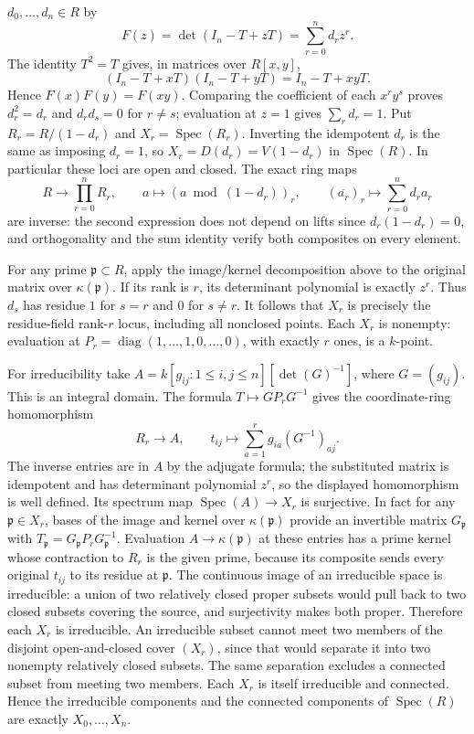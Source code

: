 \begin{example}
$d_0,\ldots,d_n\in R$ by
$$
F(z)=\det(I_n-T+zT)=\sum_{r=0}^n d_rz^r.
$$
The identity $T^2=T$ gives, in matrices over $R[x,y]$,
$$
(I_n-T+xT)(I_n-T+yT)=I_n-T+xyT.
$$
Hence $F(x)F(y)=F(xy)$. Comparing the coefficient of each
$x^ry^s$ proves $d_r^2=d_r$ and $d_rd_s=0$ for $r\ne s$;
evaluation at $z=1$ gives $\sum_r d_r=1$.
Put $R_r=R/(1-d_r)$ and $X_r=\operatorname{Spec}(R_r)$.
Inverting the idempotent $d_r$ is the same as imposing $d_r=1$,
so $X_r=D(d_r)=V(1-d_r)$ in $\operatorname{Spec}(R)$.
In particular these loci are open and closed. The exact ring maps
$$
R\longrightarrow\prod_{r=0}^n R_r,
\qquad a\longmapsto(a\bmod(1-d_r))_r,
\qquad
(\overline{a_r})_r\longmapsto\sum_{r=0}^n d_ra_r
$$
are inverse: the second expression does not depend on lifts since
$d_r(1-d_r)=0$, and orthogonality and the sum identity verify both
composites on every element.

For any prime $\mathfrak p\subset R$, apply the image/kernel
decomposition above to the original matrix over $\kappa(\mathfrak p)$.
If its rank is $r$, its determinant polynomial is exactly $z^r$.
Thus $d_s$ has residue $1$ for $s=r$ and $0$ for $s\ne r$.
It follows that $X_r$ is precisely the residue-field rank-$r$
locus, including all nonclosed points. Each $X_r$ is nonempty:
evaluation at $P_r=\operatorname{diag}(1,\ldots,1,0,\ldots,0)$,
with exactly $r$ ones, is a $k$-point.

For irreducibility take
$A=k[g_{ij}:1\leq i,j\leq n][\det(G)^{-1}]$,
where $G=(g_{ij})$. This is an integral domain. The formula
$T\mapsto GP_rG^{-1}$ gives the coordinate-ring homomorphism
$$
R_r\longrightarrow A,\qquad
t_{ij}\longmapsto\sum_{a=1}^r g_{ia}(G^{-1})_{aj}.
$$
The inverse entries are in $A$ by the adjugate formula; the
substituted matrix is idempotent and has determinant polynomial
$z^r$, so the displayed homomorphism is well defined. Its spectrum
map $\operatorname{Spec}(A)\to X_r$ is surjective. In fact for
any $\mathfrak p\in X_r$, bases of the image and kernel over
$\kappa(\mathfrak p)$ provide an invertible matrix $G_{\mathfrak p}$
with $T_{\mathfrak p}=G_{\mathfrak p}P_rG_{\mathfrak p}^{-1}$.
Evaluation $A\to\kappa(\mathfrak p)$ at these entries has a
prime kernel whose contraction to $R_r$ is the given prime,
because its composite sends every original $t_{ij}$ to its
residue at $\mathfrak p$.
The continuous image of an irreducible space is irreducible:
a union of two relatively closed proper subsets would pull back
to two closed subsets covering the source, and surjectivity makes
both proper. Therefore each $X_r$ is irreducible. An irreducible
subset cannot meet two members of the disjoint open-and-closed
cover $(X_r)$, since that would separate it into two nonempty
relatively closed subsets. The same separation excludes a connected
subset from meeting two members. Each $X_r$ is itself irreducible
and connected. Hence the irreducible components and the connected
components of $\operatorname{Spec}(R)$ are exactly $X_0,\ldots,X_n$.


\end{example}
